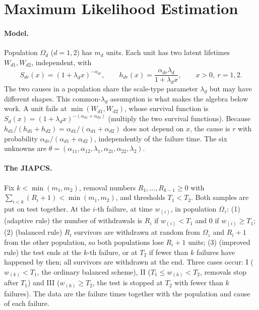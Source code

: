 \documentclass[a4paper,11pt]{article}
\begin{document}
\section{Maximum Likelihood Estimation}\label{sec2}
\paragraph{Model.} Population $\Omega_d$ ($d=1,2$) has $m_d$ units. Each unit has two latent lifetimes $W_{d1},W_{d2}$, independent, with
\[
S_{dr}(x)=(1+\lambda_d x)^{-\alpha_{dr}},\qquad h_{dr}(x)=\frac{\alpha_{dr}\lambda_d}{1+\lambda_d x},\qquad x>0,\ r=1,2 .
\]
The two causes in a population share the scale-type parameter $\lambda_d$ but may have different shapes. This common-$\lambda_d$ assumption is what makes the algebra below work. A unit fails at $\min(W_{d1},W_{d2})$, whose survival function is $S_d(x)=(1+\lambda_dx)^{-(\alpha_{d1}+\alpha_{d2})}$ (multiply the two survival functions). Because $h_{d1}/(h_{d1}+h_{d2})=\alpha_{d1}/(\alpha_{d1}+\alpha_{d2})$ does not depend on $x$, the cause is $r$ with probability $\alpha_{dr}/(\alpha_{d1}+\alpha_{d2})$, independently of the failure time. The six unknowns are $\theta=(\alpha_{11},\alpha_{12},\lambda_1,\alpha_{21},\alpha_{22},\lambda_2)$.

\paragraph{The JIAPCS.} Fix $k<\min(m_1,m_2)$, removal numbers $R_1,\dots,R_{k-1}\ge0$ with $\sum_{i<k}(R_i+1)<\min(m_1,m_2)$, and thresholds $T_1<T_2$. Both samples are put on test together. At the $i$-th failure, at time $w_{(i)}$, in population $\Omega_z$:
(1) (adaptive rule) the number of withdrawals is $R_i$ if $w_{(i)}<T_1$ and $0$ if $w_{(i)}\ge T_1$;
(2) (balanced rule) $R_i$ survivors are withdrawn at random from $\Omega_z$ and $R_i+1$ from the other population, so both populations lose $R_i+1$ units;
(3) (improved rule) the test ends at the $k$-th failure, or at $T_2$ if fewer than $k$ failures have happened by then; all survivors are withdrawn at the end.
Three cases occur: I ($w_{(k)}<T_1$, the ordinary balanced scheme), II ($T_1\le w_{(k)}<T_2$, removals stop after $T_1$) and III ($w_{(k)}\ge T_2$, the test is stopped at $T_2$ with fewer than $k$ failures). The data are the failure times together with the population and cause of each failure.
\end{document}
